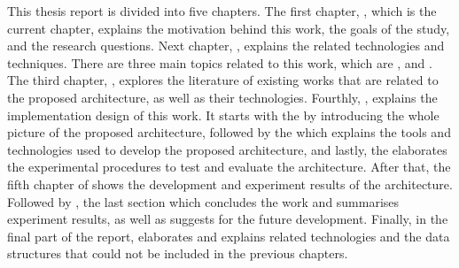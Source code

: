 \npara This thesis report is divided into five chapters.
The first chapter, , which is the current chapter, explains the motivation behind this work, the goals of the study, and the research questions.
Next chapter, , explains the related technologies and techniques.
There are three main topics related to this work, which are \textit{}, \textit{} and \textit{}.
The third chapter, , explores the literature of existing works that are related to the proposed architecture, as well as their technologies.
Fourthly, , explains the implementation design of this work.
It starts with the \textit{} by introducing the whole picture of the proposed architecture, followed by the \textit{} which explains the tools and technologies used to develop the proposed architecture, and lastly, the \textit{} elaborates the experimental procedures to test and evaluate the architecture.
After that, the fifth chapter of  shows the development and experiment results of the architecture.
Followed by , the last section which concludes the work and summarises experiment results, as well as suggests for the future development.
Finally, in the final part of the report,  elaborates and explains related technologies and the data structures that could not be included in the previous chapters.
